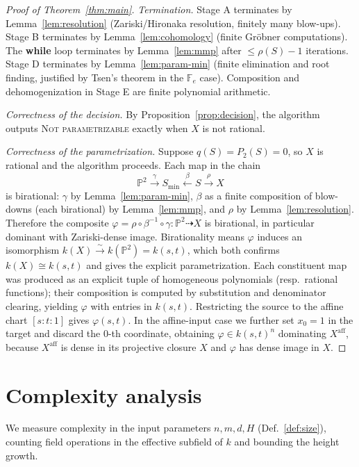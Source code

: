 \documentclass{amsart}
\theoremstyle{plain}
\theoremstyle{definition}
\newcommand{\PP}{\mathbb{P}}
\begin{document}
\begin{proof}[Proof of Theorem~\ref{thm:main}]
\emph{Termination.}  Stage A terminates by Lemma~\ref{lem:resolution}
(Zariski/Hironaka resolution, finitely many blow-ups).  Stage B terminates by
Lemma~\ref{lem:cohomology} (finite Gr\"obner computations).  The
\textbf{while} loop terminates by Lemma~\ref{lem:mmp} after $\le\rho(S)-1$
iterations.  Stage D terminates by Lemma~\ref{lem:param-min} (finite
elimination and root finding, justified by Tsen's theorem in the $\mathbb F_e$
case).  Composition and dehomogenization in Stage E are finite polynomial
arithmetic.

\emph{Correctness of the decision.}  By Proposition~\ref{prop:decision}, the
algorithm outputs \textsc{Not parametrizable} exactly when $X$ is not rational.

\emph{Correctness of the parametrization.}  Suppose $q(S)=P_2(S)=0$, so $X$ is
rational and the algorithm proceeds.  Each map in the chain
\[
\PP^2 \xrightarrow{\ \gamma\ } S_{\min}
\xleftarrow{\ \beta\ } S \xrightarrow{\ \rho\ } X
\]
is birational: $\gamma$ by Lemma~\ref{lem:param-min}, $\beta$ as a finite
composition of blow-downs (each birational) by Lemma~\ref{lem:mmp}, and $\rho$
by Lemma~\ref{lem:resolution}.  Therefore the composite
$\varphi=\rho\circ\beta^{-1}\circ\gamma\colon\PP^2\dashrightarrow X$ is
birational, in particular dominant with Zariski-dense image.  Birationality
means $\varphi$ induces an isomorphism $k(X)\xrightarrow{\sim}k(\PP^2)=k(s,t)$,
which both confirms $k(X)\cong k(s,t)$ and gives the explicit parametrization.
Each constituent map was produced as an explicit tuple of homogeneous
polynomials (resp.\ rational functions); their composition is computed by
substitution and denominator clearing, yielding $\varphi$ with entries in
$k(s,t)$.  Restricting the source to the affine chart $[s:t:1]$ gives
$\varphi(s,t)$.  In the affine-input case we further set $x_0=1$ in the target
and discard the $0$-th coordinate, obtaining $\varphi\in k(s,t)^n$ dominating
$X^{\mathrm{aff}}$, because $X^{\mathrm{aff}}$ is dense in its projective closure
$X$ and $\varphi$ has dense image in $X$.
\end{proof}

\section{Complexity analysis}

We measure complexity in the input parameters $n,m,d,H$ (Def.~\ref{def:size}),
counting field operations in the effective subfield of $k$ and bounding the
height growth.
\end{document}
